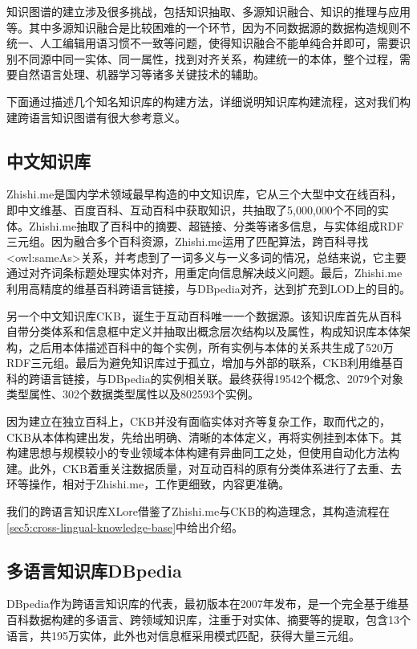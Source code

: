 知识图谱的建立涉及很多挑战，包括知识抽取、多源知识融合、知识的推理与应用等。其中多源知识融合是比较困难的一个环节，因为不同数据源的数据构造规则不统一、人工编辑用语习惯不一致等问题，使得知识融合不能单纯合并即可，需要识别不同源中同一实体、同一属性，找到对齐关系，构建统一的本体，整个过程，需要自然语言处理、机器学习等诸多关键技术的辅助。

下面通过描述几个知名知识库的构建方法，详细说明知识库构建流程，这对我们构建跨语言知识图谱有很大参考意义。

\subsection{中文知识库}

Zhishi.me\cite{niu2011zhishi,wang2014publishing}是国内学术领域最早构造的中文知识库，它从三个大型中文在线百科，即中文维基、百度百科、互动百科中获取知识，共抽取了5,000,000个不同的实体。Zhishi.me抽取了百科中的摘要、超链接、分类等诸多信息，与实体组成RDF三元组。因为融合多个百科资源，Zhishi.me运用了匹配算法，跨百科寻找<owl:sameAs>关系，并考虑到了一词多义与一义多词的情况，总结来说，它主要通过对齐词条标题处理实体对齐，用重定向信息解决歧义问题。最后，Zhishi.me利用高精度的维基百科跨语言链接，与DBpedia对齐，达到扩充到LOD上的目的。

另一个中文知识库CKB\cite{wang2011building}，诞生于互动百科唯一一个数据源。该知识库首先从百科自带分类体系和信息框中定义并抽取出概念层次结构以及属性，构成知识库本体架构，之后用本体描述百科中的每个实例，所有实例与本体的关系共生成了520万RDF三元组。最后为避免知识库过于孤立，增加与外部的联系，CKB利用维基百科的跨语言链接，与DBpedia的实例相关联。最终获得19542个概念、2079个对象类型属性、302个数据类型属性以及802593个实例。

因为建立在独立百科上，CKB并没有面临实体对齐等复杂工作，取而代之的，CKB从本体构建出发，先给出明确、清晰的本体定义，再将实例挂到本体下。其构建思想与规模较小的专业领域本体构建有异曲同工之处，但使用自动化方法构建。此外，CKB着重关注数据质量，对互动百科的原有分类体系进行了去重、去环等操作，相对于Zhishi.me，工作更细致，内容更准确。

我们的跨语言知识库XLore借鉴了Zhishi.me与CKB的构造理念，其构造流程在\ref{sec5:cross-lingual-knowledge-base}中给出介绍。

\subsection{多语言知识库DBpedia}
DBpedia作为跨语言知识库的代表，最初版本在2007年发布\cite{auer2007dbpedia}，是一个完全基于维基百科数据构建的多语言、跨领域知识库，注重于对实体、摘要等的提取，包含13个语言，共195万实体，此外也对信息框采用模式匹配，获得大量三元组。

